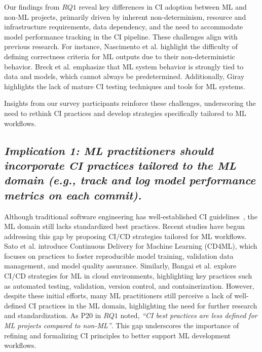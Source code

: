 Our findings from $RQ1$ reveal key differences in CI adoption between ML and non-ML projects, primarily driven by inherent non-determinism, resource and infrastructure requirements, data dependency, and the need to accommodate model performance tracking in the CI pipeline. These challenges align with previous research. For instance, Nascimento et al. \citep{nascimento2020software} highlight the difficulty of defining correctness criteria for ML outputs due to their non-deterministic behavior. Breck et al. \citep{breck2017ml} emphasize that ML system behavior is strongly tied to data and models, which cannot always be predetermined. Additionally, Giray \citep{giray2021software} highlights the lack of mature CI testing techniques and tools for ML systems.

Insights from our survey participants reinforce these challenges, underscoring the need to rethink CI practices and develop strategies specifically tailored to ML workflows.

\subsection*{\textbf{\textit{Implication 1: ML practitioners should incorporate CI practices tailored to the ML domain (e.g., track and log model performance metrics on each commit).}}}



Although traditional software engineering has well-established CI guidelines~\citep{duvall2007continuous, fowler-ci-2006}, the ML domain still lacks standardized best practices. Recent studies have begun addressing this gap by proposing CI/CD strategies tailored for ML workflows.
Sato et al. \citep{Fowler2019CD4ML} introduce Continuous Delivery for Machine Learning (\textsc{CD4ML}), which focuses on practices to foster reproducible model training, validation data management, and model quality assurance. Similarly, Bangai et al. \citep{bagai2024implementing} explore CI/CD strategies for ML in cloud environments, highlighting key practices such as automated testing, validation, version control, and containerization.
However, despite these initial efforts, many ML practitioners still perceive a lack of well-defined CI practices in the ML domain, highlighting the need for further research and standardization. As P20 in $RQ1$ noted, \textit{``CI best practices are less defined for ML projects compared to non-ML''}. This gap underscores the importance of refining and formalizing CI principles to better support ML development workflows.

